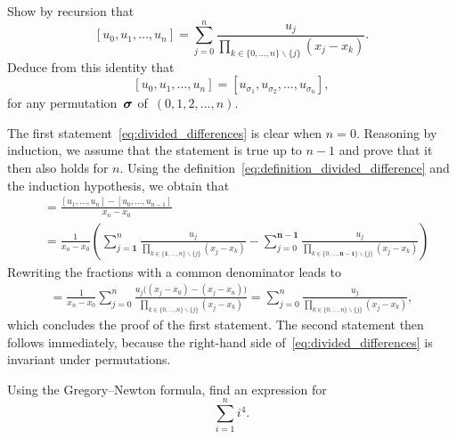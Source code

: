 \begin{exercise}
    \label{exercise:divided_differences}
    Show by recursion that
    \begin{equation}
        \label{eq:divided_differences}
        [u_{0}, u_{1}, \dotsc, u_{n}] = \sum_{j=0}^{n} \frac{u_{j}}{\prod_{ k \in \{0, \dotsc, n\} \backslash \{ j\}} (x_{j} - x_{k})}.
    \end{equation}
    Deduce from this identity that
    \[
        [u_{0}, u_{1}, \dotsc, u_{n}] = [u_{\sigma_1}, u_{\sigma_2}, \dotsc, u_{\sigma_n}],
    \]
    for any permutation~$\mathbf{\boldsymbol{\sigma}}$ of~$(0, 1, 2, \dotsc, n)$.
\end{exercise}
\begin{solution}
    The first statement~\eqref{eq:divided_differences} is clear when $n = 0$.
    Reasoning by induction, we assume that the statement is true up to $n-1$ and prove that it then also holds for $n$.
    Using the definition~\eqref{eq:definition_divided_difference} and the induction hypothesis,
    we obtain that
    \begin{align*}
        [u_{0}, u_{1}, \dotsc, u_{n}]
        &= \frac{[u_{1}, \dotsc, u_{n}] - [u_{0}, \dotsc, u_{n-1}]}{x_{n}-x_{0}}  \\
        &= \frac{1}{x_n - x_0} \left( \sum_{j=\mathbf{1}}^{n} \frac{u_{j}}{\prod_{ k \in \{\mathbf{1}, \dotsc, n\} \backslash \{ j\}} (x_{j} - x_{k})} -  \sum_{j=0}^{\mathbf{n-1}} \frac{u_{j}}{\prod_{ k \in \{0, \dotsc,\mathbf{n-1}\} \backslash \{ j\}} (x_{j} - x_{k})}  \right)
    \end{align*}
    Rewriting the fractions with a common denominator leads to
    \begin{align*}
        [u_{0}, u_{1}, \dotsc, u_{n}]
        = \frac{1}{x_n - x_0}  \sum_{j=0}^{n} \frac{u_{j} \bigl((x_j - x_0) - (x_j - x_n)\bigr)}{\prod_{ k \in \{0, \dotsc, n\} \backslash \{ j\}} (x_{j} - x_{k})}
        =  \sum_{j=0}^{n} \frac{u_j}{\prod_{ k \in \{0, \dotsc, n\} \backslash \{ j\}} (x_{j} - x_{k})},
    \end{align*}
    which concludes the proof of the first statement.
    The second statement then follows immediately,
    because the right-hand side of~\eqref{eq:divided_differences} is invariant under permutations.
\end{solution}

\begin{exercise}
    Using the Gregory--Newton formula,
    find an expression for
    \[
        \sum_{i=1}^{n} i^4.
    \]
\end{exercise}

